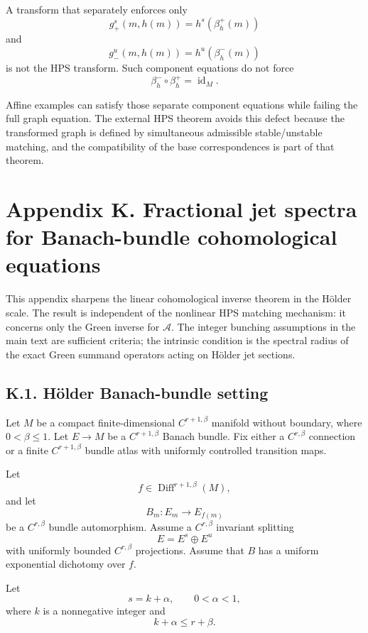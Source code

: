 \documentclass[12pt,a4paper]{article}
\theoremstyle{plain}
\numberwithin{equation}{section}
\numberwithin{theorem}{section}
\begin{document}
A transform that separately enforces only
\[
g_+^s(m,h(m))=h^s(\beta_h^+(m))
\]
and
\[
g_-^u(m,h(m))=h^u(\beta_h^-(m))
\]
is not the HPS transform. Such component equations do not force
\[
\beta_h^-\circ\beta_h^+=\operatorname{id}_M.
\]

Affine examples can satisfy those separate component equations while failing the full graph equation. The external HPS theorem avoids this defect because the transformed graph is defined by simultaneous admissible stable/unstable matching, and the compatibility of the base correspondences is part of that theorem.

\clearpage

\section{Appendix K. Fractional jet spectra for Banach-bundle cohomological equations}

This appendix sharpens the linear cohomological inverse theorem in the H\"older scale. The result is independent of the nonlinear HPS matching mechanism: it concerns only the Green inverse for $\mathcal A$. The integer bunching assumptions in the main text are sufficient criteria; the intrinsic condition is the spectral radius of the exact Green summand operators acting on H\"older jet sections.

\subsection{K.1. H\"older Banach-bundle setting}

Let $M$ be a compact finite-dimensional $C^{r+1,\beta}$ manifold without boundary, where $0<\beta\le1$. Let $E\to M$ be a $C^{r+1,\beta}$ Banach bundle. Fix either a $C^{r,\beta}$ connection or a finite $C^{r+1,\beta}$ bundle atlas with uniformly controlled transition maps.

Let
\[
f\in\operatorname{Diff}^{r+1,\beta}(M),
\]
and let
\[
B_m:E_m\to E_{f(m)}
\]
be a $C^{r,\beta}$ bundle automorphism. Assume a $C^{r,\beta}$ invariant splitting
\[
E=E^s\oplus E^u
\]
with uniformly bounded $C^{r,\beta}$ projections. Assume that $B$ has a uniform exponential dichotomy over $f$.

Let
\[
s=k+\alpha,
\qquad
0<\alpha<1,
\]
where $k$ is a nonnegative integer and
\[
k+\alpha\le r+\beta.
\]
\end{document}
